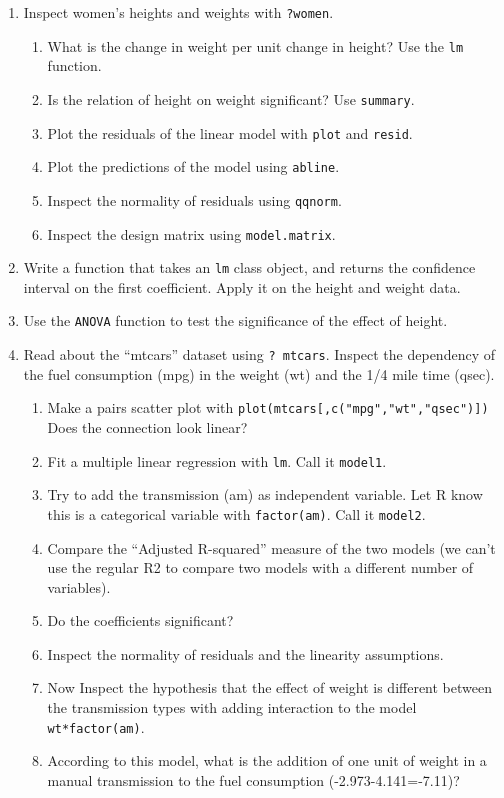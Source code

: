\documentclass[]{book}
\providecommand{\tightlist}{%
  \setlength{\itemsep}{0pt}\setlength{\parskip}{0pt}}
\theoremstyle{definition}
\theoremstyle{definition}
\theoremstyle{definition}
\theoremstyle{remark}
\begin{document}
\begin{enumerate}
\def\labelenumi{\arabic{enumi}.}
\item
  Inspect women's heights and weights with \texttt{?women}.

  \begin{enumerate}
  \def\labelenumii{\arabic{enumii}.}
  \tightlist
  \item
    What is the change in weight per unit change in height? Use the \texttt{lm} function.
  \item
    Is the relation of height on weight significant? Use \texttt{summary}.
  \item
    Plot the residuals of the linear model with \texttt{plot} and \texttt{resid}.
  \item
    Plot the predictions of the model using \texttt{abline}.
  \item
    Inspect the normality of residuals using \texttt{qqnorm}.
  \item
    Inspect the design matrix using \texttt{model.matrix}.
  \end{enumerate}
\item
  Write a function that takes an \texttt{lm} class object, and returns the confidence interval on the first coefficient. Apply it on the height and weight data.
\item
  Use the \texttt{ANOVA} function to test the significance of the effect of height.
\item
  Read about the ``mtcars'' dataset using \texttt{?\ mtcars}. Inspect the dependency of the fuel consumption (mpg) in the weight (wt) and the 1/4 mile time (qsec).

  \begin{enumerate}
  \def\labelenumii{\arabic{enumii}.}
  \tightlist
  \item
    Make a pairs scatter plot with \texttt{plot(mtcars{[},c("mpg","wt","qsec"){]})}
    Does the connection look linear?
  \item
    Fit a multiple linear regression with \texttt{lm}. Call it \texttt{model1}.
  \item
    Try to add the transmission (am) as independent variable. Let R know this is a categorical variable with \texttt{factor(am)}. Call it \texttt{model2}.
  \item
    Compare the ``Adjusted R-squared'' measure of the two models (we can't use the regular R2 to compare two models with a different number of variables).
  \item
    Do the coefficients significant?
  \item
    Inspect the normality of residuals and the linearity assumptions.
  \item
    Now Inspect the hypothesis that the effect of weight is different between the transmission types with adding interaction to the model \texttt{wt*factor(am)}.
  \item
    According to this model, what is the addition of one unit of weight in a manual transmission to the fuel consumption (-2.973-4.141=-7.11)?
  \end{enumerate}
\end{enumerate}
\end{document}
